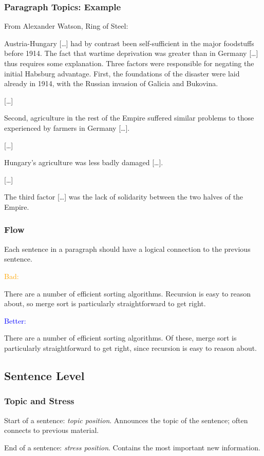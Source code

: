 \documentclass[xetex]{beamer}
\newcommand{\bad}[1]{\textcolor{orange}{#1}}
\newcommand{\good}[1]{\textcolor{blue}{#1}}
\begin{document}
\begin{frame}
  \frametitle{Paragraph Topics: Example}

  From Alexander Watson, Ring of Steel:

  \medskip

  \small
  Austria-Hungary [\dots] had by contrast been self-sufficient in the major foodstuffs before 1914.
  The fact that wartime deprivation was greater than in Germany [\dots] thus requires some explanation.
  Three factors were responsible for negating the initial Habsburg advantage.
  First, the foundations of the disaster were laid already in 1914, with the Russian invasion of Galicia and Bukovina.

  [\dots]

  Second, agriculture in the rest of the Empire suffered similar problems to those experienced by farmers in Germany [\dots].

  [\dots]

  Hungary's agriculture was less badly damaged [\dots].

  [\dots]

  The third factor [\dots] was the lack of solidarity between the two halves of the Empire.
\end{frame}

\begin{frame}
  \frametitle{Flow}

  Each sentence in a paragraph should have a logical connection to the previous sentence.

  \medskip
  \pause

  \bad{Bad:}

  {
    \small
    There are a number of efficient sorting algorithms.
    Recursion is easy to reason about, so merge sort is particularly straightforward to get right.
  }

  \medskip
  \pause

  \good{Better:}

  {
    \small
    There are a number of efficient sorting algorithms.
    Of these, merge sort is particularly straightforward to get right, since recursion is easy to reason about.
  }
\end{frame}

\subsection{Sentence Level}

\begin{frame}
  \frametitle{Topic and Stress}

  Start of a sentence: \emph{topic position}.
  Announces the topic of the sentence; often connects to previous material.

  \medskip

  End of a sentence: \emph{stress position}.
  Contains the most important new information.
\end{frame}
\end{document}
